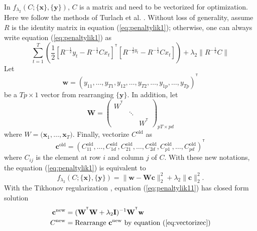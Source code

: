 \documentclass[fleqn]{article}
\let\oldref\ref
\renewcommand{\ref}[1]{(\oldref{#1})}
\newcommand{\T}{^{\ensuremath{\mathsf{T}}}}           %
\begin{document}
In $f_{\lambda_2}(C;\{\mathbf{x}\},\{\mathbf{y}\})$, $C$ is a matrix and need to be vectorized for optimization. Here we follow the methods of Turlach et al. \cite{turlach2005simultaneous}. Without loss of generality, assume $R$ is the identity matrix in equation \ref{eq:penaltylik1}; otherwise, one can always write equation \ref{eq:penaltylik1} as
\begin{equation*}
\sum\limits_{t=1}^{T}\left(\frac{1}{2}[R^{-\frac{1}{2}}y_t-R^{-\frac{1}{2}}Cx_t]^{\T}[R^{-\frac{1}{2}y_t}-R^{-\frac{1}{2}}Cx_t]\right) + \lambda_2 \|R^{-\frac{1}{2}}C\|
\end{equation*}
Let
\begin{equation*}
\mathbf{w} = (y_{11},\ldots,y_{T1},y_{12},\ldots,y_{T2},\ldots,y_{1p},\ldots,y_{Tp})^{\T}
\end{equation*}
be a $Tp\times 1$ vector from rearranging  $\{\mathbf{y}\}$. In addition, let
\[
\mathbf{W} = \begin{pmatrix}
W^{\T}&&\\
&\ddots&\\
&&W^{\T}
\end{pmatrix}_{pT\times pd}
\]
where $W=\biggl(\mathbf{x}_1,\ldots,\mathbf{x}_{T}\biggr)$. Finally, vectorize $C^{\text{old}}$ as
\begin{equation}\label{eq:vectorizec}
\mathbf{c}^{\text{old}} = (C_{11}^{\text{old}},\ldots,C_{1d}^{\text{old}},C_{21}^{\text{old}},\ldots,C_{2d}^{\text{old}},C_{p1}^{\text{old}},\ldots,C_{pd}^{\text{old}})^{\T}
\end{equation}
where $C_{ij}$ is the element at row $i$ and column $j$ of $C$. With these new notations, the equation \ref{eq:penaltylik1} is equivalent to
\begin{equation}\label{eq:penaltylik11}
f_{\lambda_2}(C;\{\mathbf{x}\},\{\mathbf{y}\}) = \|\mathbf{w}  - \mathbf{Wc}\|_2^2 + \lambda_2\|\mathbf{c}\|_2^2.
\end{equation}
With the Tikhonov regularization \cite{tikhonov1943stability}, equation \ref{eq:penaltylik11} has closed form solution
\begin{equation}\label{eq:updatec}
\begin{aligned}
\mathbf{c}^{\text{new}} &= (\mathbf{W}^{\T}\mathbf{W} + \lambda_2\mathbf{I})^{-1}\mathbf{W}^{\T}\mathbf{w}\\
C^{\text{new}} &=\text{Rearrange } \mathbf{c}^{\text{new}} \text{ by equation }\ref{eq:vectorizec}
\end{aligned}
\end{equation}
\end{document}
